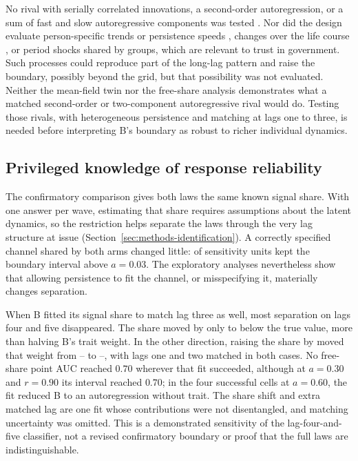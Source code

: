No rival with serially correlated innovations, a second-order autoregression, or a sum of fast and slow autoregressive components was tested \cite{granger1976,asparouhov2018}. Nor did the design evaluate person-specific trends or persistence speeds \cite{bollencurran2004,asparouhov2018}, changes over the life course \cite{alwinkrosnick1991,lersch2023}, or period shocks shared by groups, which are relevant to trust in government. Such processes could reproduce part of the long-lag pattern and raise the boundary, possibly beyond the grid, but that possibility was not evaluated. Neither the mean-field twin nor the free-share analysis demonstrates what a matched second-order or two-component autoregressive rival would do. Testing those rivals, with heterogeneous persistence and matching at lags one to three, is needed before interpreting B's boundary as robust to richer individual dynamics.

\subsection{Privileged knowledge of response reliability}\label{sec:disc-attribution}

The confirmatory comparison gives both laws the same known signal share. With one answer per wave, estimating that share requires assumptions about the latent dynamics, so the restriction helps separate the laws through the very lag structure at issue (Section~\ref{sec:methods-identification}). A correctly specified channel shared by both arms changed little:  of  sensitivity units kept the boundary interval above $a=0.03$. The exploratory analyses nevertheless show that allowing persistence to fit the channel, or misspecifying it, materially changes separation.

When B fitted its signal share to match lag three as well, most separation on lags four and five disappeared. The share moved by only  to  below the true value, more than halving B's trait weight. In the other direction, raising the share by  moved that weight from -- to --, with lags one and two matched in both cases. No free-share point AUC reached $0.70$ wherever that fit succeeded, although at $a=0.30$ and $r=0.90$ its interval reached $0.70$; in the four successful cells at $a=0.60$, the fit reduced B to an autoregression without trait. The share shift and extra matched lag are one fit whose contributions were not disentangled, and matching uncertainty was omitted. This is a demonstrated sensitivity of the lag-four-and-five classifier, not a revised confirmatory boundary or proof that the full laws are indistinguishable.

